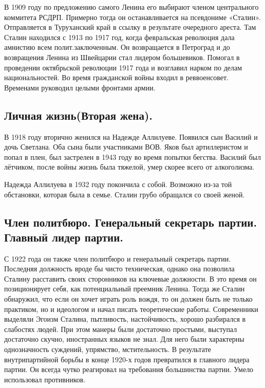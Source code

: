 В 1909 году по предложению самого Ленина его выбирают членом центрального коммитета РСДРП. Примерно тогда он останавливается на псевдониме «Сталин». Отправляется в Туруханский край в ссылку в результате очередного ареста. Там Сталин находился с 1913 по 1917 год, когда февральская революция дала амнистию всем полит.заключенным. Он возвращается в Петроград и до возвращения Ленина из Швейцарии стал лидером большевиков. Помогал в проведении октябрьской революции 1917 года и возглавил нарком по делам национальностей. Во время гражданской войны входил в реввоенсовет. Временами руководил целыми фронтами армии. 

\subsection{Личная жизнь(Вторая жена).}

В 1918 году вторично женился на Надежде Аллилуеве. Появился сын Василий и дочь Светлана. Оба сына были участниками ВОВ. Яков был артиллеристом и попал в плен, был застрелен в 1943 году во время попытки бегства. Василий был лётчиком, после войны жизнь была тяжелой, умер скорее всего от алкоголизма.

Надежда Аллилуева в 1932 году покончила с собой. Возможно из-за той обстановки, которая была в семье. Сталин грубо обращался со своей женой.

\subsection{Член политбюро. Генеральный секретарь партии. Главный лидер партии.}

С 1922 года он также член политбюро и генеральный секретарь партии. Последняя должность вроде бы чисто техническая, однако она позволила Сталину расставить своих сторонников на ключевые должности. В это время он позиционирует себя, как потенциальный преемник Ленина. Тогда же Сталин обнаружил, что если он хочет играть роль вождя, то он должен быть не только практиком, но и идеологом и начал писать теоретические работы. Современники выделяли Эгоизм Сталина, пытливость, настойчивость, хорошо разбирался в слабостях людей. При этом манеры были достаточно простыми, выступал достаточно скучно, иностранных языков не знал. Для него были характерны однозначность суждений, упрямство, мстительность. В результате внутрипартийной борьбы в конце 1920-х годов превратился в главного лидера партии. Он всегда чутко реагировал на требования большинства партии. Умело использовал противников.

